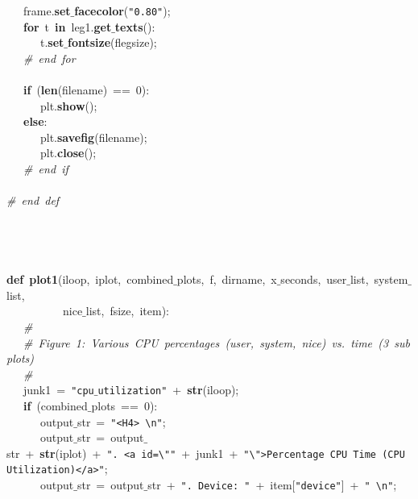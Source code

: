 \mbox{}\ \ \ frame.\textbf{set$\_$facecolor}(\texttt{"{}0.80"{}}); \\
\mbox{}\ \ \ \textbf{for}\ t\ \textbf{in}\ leg1.\textbf{get$\_$texts}(): \\
\mbox{}\ \ \ \ \ \ t.\textbf{set$\_$fontsize}(flegsize); \\
\mbox{}\ \ \ \textit{\#\ end\ for} \\
\mbox{}\ \ \  \\
\mbox{}\ \ \ \textbf{if}\ (\textbf{len}(filename)\ ==\ 0): \\
\mbox{}\ \ \ \ \ \ plt.\textbf{show}(); \\
\mbox{}\ \ \ \textbf{else}: \\
\mbox{}\ \ \ \ \ \ plt.\textbf{savefig}(filename); \\
\mbox{}\ \ \ \ \ \ plt.\textbf{close}(); \\
\mbox{}\ \ \ \textit{\#\ end\ if} \\
\mbox{}\ \ \  \\
\mbox{}\textit{\#\ end\ def} \\
\mbox{} \\
\mbox{} \\
\mbox{} \\
\mbox{} \\
\mbox{}\textbf{def}\ \textbf{plot1}(iloop,\ iplot,\ combined$\_$plots,\ f,\ dirname,\ x$\_$seconds,\ user$\_$list,\ system$\_$list,\  \\
\mbox{}\ \ \ \ \ \ \ \ \ \ nice$\_$list,\ fsize,\ item): \\
\mbox{}\ \ \ \textit{\#} \\
\mbox{}\ \ \ \textit{\#\ Figure\ 1:\ Various\ CPU\ percentages\ (user,\ system,\ nice)\ vs.\ time\ (3\ subplots)} \\
\mbox{}\ \ \ \textit{\#} \\
\mbox{}\ \ \ junk1\ =\ \texttt{"{}cpu$\_$utilization"{}}\ +\ \textbf{str}(iloop); \\
\mbox{}\ \ \ \textbf{if}\ (combined$\_$plots\ ==\ 0): \\
\mbox{}\ \ \ \ \ \ output$\_$str\ =\ \texttt{"{}\textless{}H4\textgreater{}\ \textbackslash{}n"{}}; \\
\mbox{}\ \ \ \ \ \ output$\_$str\ =\ output$\_$str\ +\ \textbf{str}(iplot)\ +\ \texttt{"{}.\ \textless{}a\ id=\textbackslash{}"{}"{}}\ +\ junk1\ +\ \texttt{"{}\textbackslash{}"{}\textgreater{}Percentage\ CPU\ Time\ (CPU\ Utilization)\textless{}/a\textgreater{}"{}}; \\
\mbox{}\ \ \ \ \ \ output$\_$str\ =\ output$\_$str\ +\ \texttt{"{}.\ Device:\ "{}}\ +\ item[\texttt{"{}device"{}}]\ +\ \texttt{"{}\ \textbackslash{}n"{}}; \\
